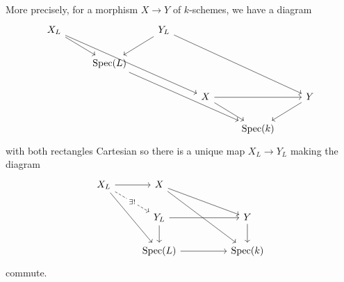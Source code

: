 More precisely, for a morphism $X\to Y$ of $k$-schemes, we have a diagram 
$$%
\begin{tikzcd}
	{X_{L}} && {Y_{L}} \\
	& {\spec(L)} \\
	&&& X && Y \\
	&&&& {\spec(k)}
	\arrow[from=1-1, to=2-2]
	\arrow[from=1-1, to=3-4]
	\arrow[from=1-3, to=2-2]
	\arrow[from=1-3, to=3-6]
	\arrow[from=2-2, to=4-5]
	\arrow[from=3-4, to=3-6]
	\arrow[from=3-4, to=4-5]
	\arrow[from=3-6, to=4-5]
\end{tikzcd}$$
with both rectangles Cartesian so there is a unique map $X_{L}\to Y_{L}$ making the diagram 
$$%
\begin{tikzcd}
	{X_{L}} & X \\
	& {Y_{L}} && Y \\
	& {\spec(L)} && {\spec(k)}
	\arrow[from=1-1, to=1-2]
	\arrow["{\exists!}"{description}, dashed, from=1-1, to=2-2]
	\arrow[from=1-1, to=3-2]
	\arrow[from=1-2, to=2-4]
	\arrow[from=1-2, to=3-4]
	\arrow[from=2-2, to=2-4]
	\arrow[from=2-2, to=3-2]
	\arrow[from=2-4, to=3-4]
	\arrow[from=3-2, to=3-4]
\end{tikzcd}$$
commute. 

